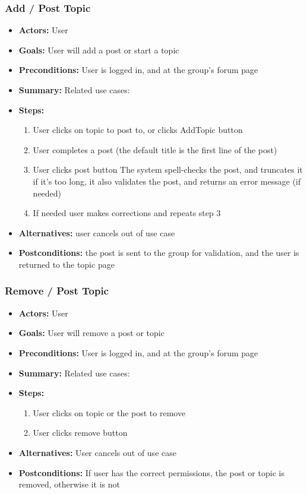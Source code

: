 			\subsubsection{Add / Post Topic}
			\begin{itemize}
				\item{\textbf{Actors:} User}
				\item{\textbf{Goals:} User will add a post or start a topic}
				\item{\textbf{Preconditions:} User is logged in, and at the group's forum page}
				\item{\textbf{Summary:} Related use cases: }
				\item{\textbf{Steps:}
				\begin{enumerate}
					\item{User clicks on topic to post to, or clicks AddTopic button}
					\item{User completes a post (the default title is the first line of the post)}
					\item{User clicks post button The system spell-checks the post, and truncates it if it's too long, it also validates the post, and returns an error message (if needed)}
					\item{If needed user makes corrections and repeats step 3}
				\end{enumerate}
				}
				\item{\textbf{Alternatives:} user cancels out of use case}
				\item{\textbf{Postconditions:} the post is sent to the group for validation, and the user is returned to the topic page}
			\end{itemize}
			\subsubsection{Remove / Post Topic}
			\begin{itemize}
				\item{\textbf{Actors:} User}
				\item{\textbf{Goals:} User will remove a post or topic}
				\item{\textbf{Preconditions:} User is logged in, and at the group's forum page}
				\item{\textbf{Summary:} Related use cases:}
				\item{\textbf{Steps:}
				\begin{enumerate}
					\item{User clicks on topic or the post to remove}
					\item{User clicks remove button}
				\end{enumerate}
				}
				\item{\textbf{Alternatives:} User cancels out of use case}
				\item{\textbf{Postconditions:} If user has the correct permissions, the post or topic is removed, otherwise it is not}
			\end{itemize}

